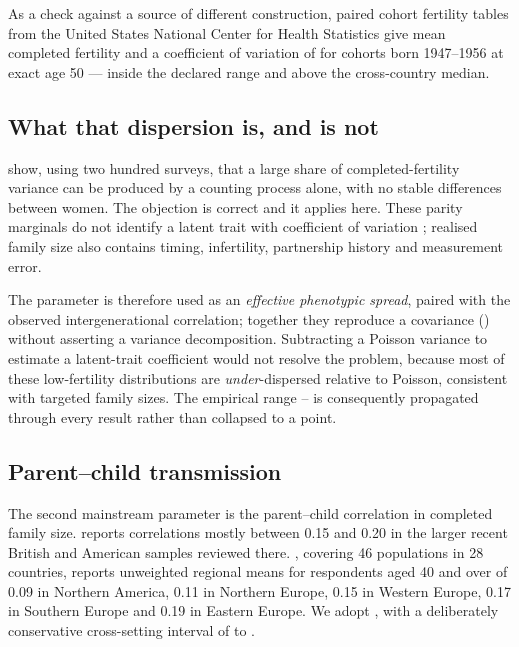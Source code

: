 As a check against a source of different construction, paired cohort fertility
tables from the United States National Center for Health Statistics
\citep{cdccohort} give mean completed fertility \CVUnitedStatesMean{} and a
coefficient of variation of \CVUnitedStates{} for cohorts born 1947--1956 at
exact age 50 --- inside the declared range and above the cross-country median.

\subsection{What that dispersion is, and is not}

\citet{hruschka2016} show, using two hundred surveys, that a large share of
completed-fertility variance can be produced by a counting process alone, with no
stable differences between women. The objection is correct and it applies here.
These parity marginals do not identify a latent trait with coefficient of
variation \FamilySizeCV{}; realised family size also contains timing,
infertility, partnership history and measurement error.

The parameter is therefore used as an \emph{effective phenotypic spread}, paired
with the observed intergenerational correlation; together they reproduce a
covariance () without asserting a variance decomposition.
Subtracting a Poisson variance to estimate a latent-trait coefficient would not
resolve the problem, because most of these low-fertility distributions are
\emph{under}-dispersed relative to Poisson, consistent with targeted family
sizes. The empirical range \FamilySizeCVLow{}--\FamilySizeCVHigh{} is consequently
propagated through every result rather than collapsed to a point.

\subsection{Parent--child transmission}

The second mainstream parameter is the parent--child correlation in completed
family size. \citet{murphy1999} reports correlations mostly between 0.15 and 0.20
in the larger recent British and American samples reviewed there.
\citet{murphy2013}, covering 46 populations in 28 countries, reports unweighted
regional means for respondents aged 40 and over of 0.09 in Northern America, 0.11
in Northern Europe, 0.15 in Western Europe, 0.17 in Southern Europe and 0.19 in
Eastern Europe. We adopt \Persistence{}, with a deliberately conservative
cross-setting interval of \PersistenceLow{} to \PersistenceHigh{}.

